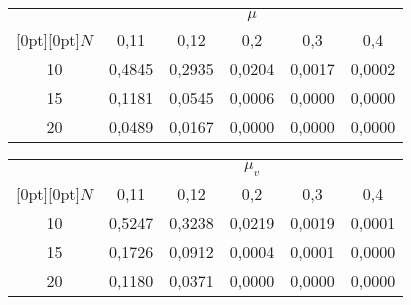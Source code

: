 \renewcommand{\figurename}{\protect\bf Таблица}
\begin{figure*}
{\small
\begin{minipage}[t]{76mm}
\begin{center}
\vspace*{2ex}

\tabcolsep=6.5pt
\begin{tabular}{|c|c|c|c|c|c|}
\hline
&\multicolumn{5}{c|}{$\mu$}\\
\cline{2-6}
\multicolumn{1}{|c|}{\raisebox{4pt}[0pt][0pt]{$N$}}&0{,}11&0{,}12&0{,}2&0{,}3&0{,}4\\
\hline
10&0,4845&0,2935&0,0204&0,0017&0,0002\\
15&0,1181&0,0545&0,0006&0,0000&0,0000\\
20&0,0489&0,0167&0,0000&0,0000&0,0000\\
\hline
\end{tabular}
\end{center}
\end{minipage}
\hfill
\begin{minipage}[t]{76mm}
\begin{center}
\vspace*{2ex}

\tabcolsep=6.5pt
\begin{tabular}{|c|c|c|c|c|c|}
\hline
&\multicolumn{5}{c|}{$\mu_v$}\\
\cline{2-6}
\multicolumn{1}{|c|}{\raisebox{4pt}[0pt][0pt]{$N$}}&0{,}11&0{,}12&0{,}2&0{,}3&0{,}4\\
\hline
10&0,5247&0,3238&0,0219&0,0019&0,0001\\
15&0,1726&0,0912&0,0004&0,0001&0,0000\\
20&0,1180&0,0371&0,0000&0,0000&0,0000\\
\hline
\end{tabular}
\end{center}
\end{minipage}
}
\vspace*{6pt}
\end{figure*}

